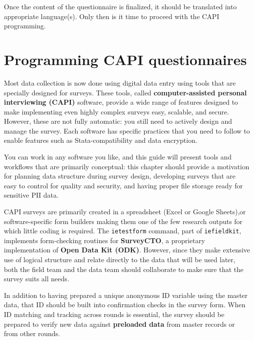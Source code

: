 Once the content of the questionnaire is finalized, it should be translated into appropriate language(s). Only then is it time to proceed with the CAPI programming.



\section{Programming CAPI questionnaires}

Most data collection is now done using digital data entry
using tools that are specially designed for surveys.
These tools, called \textbf{computer-assisted personal interviewing (CAPI)} software,
provide a wide range of features designed to make
implementing even highly complex surveys easy, scalable, and secure.
However, these are not fully automatic:
you still need to actively design and manage the survey.
Each software has specific practices that you need to follow
to enable features such as Stata-compatibility and data encryption.

You can work in any software you like,
and this guide will present tools and workflows
that are primarily conceptual:
this chapter should provide a motivation for
planning data structure during survey design,
developing surveys that are easy to control for quality and security,
and having proper file storage ready for sensitive PII data.


CAPI surveys
are primarily created in a spreadsheet (Excel or Google Sheets),or software-specific form builders
making them one of the few research outputs for which little coding is required.
The \texttt{ietestform} command, part of
\texttt{iefieldkit}, implements form-checking routines
for \textbf{SurveyCTO}, a proprietary implementation of \textbf{Open Data Kit (ODK)}.
However, since they make extensive use of logical structure and
relate directly to the data that will be used later,
both the field team and the data team should
collaborate to make sure that the survey suits all needs.\cite{krosnick2018questionnaire}

In addition to having prepared a unique anonymous ID variable using the master data,
that ID should be built into confirmation checks in the survey form.
When ID matching and tracking across rounds is essential, the survey should be prepared to verify new data
against \textbf{preloaded data} from master records or from other rounds.

